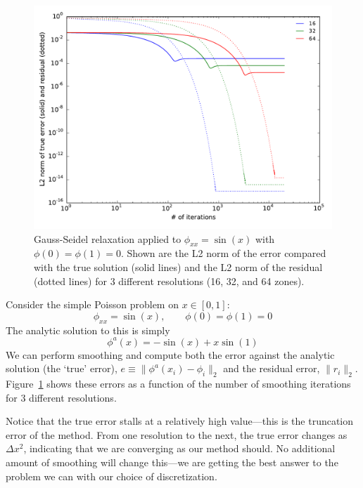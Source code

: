 \begin{figure}
\centering
\includegraphics[width=\linewidth]{smooth-error}
\caption[Convergence as a function of number of iterations using Gauss-Seidel relaxation]{\label{fig:smootherror} Gauss-Seidel relaxation applied to
  $\phi_{xx} = \sin(x)$ with $\phi(0) = \phi(1) = 0$.  Shown are the
  L2 norm of the error compared with the true solution (solid lines)
  and the L2 norm of the residual (dotted lines) for 3 different
  resolutions (16, 32, and 64 zones). \\
  }
\end{figure}

Consider the simple Poisson problem on $x \in [0,1]$:
\begin{equation}
\phi_{xx} = \sin(x), \qquad \phi(0) = \phi(1) = 0
\end{equation}
The analytic solution to this is simply 
\begin{equation}
\phi^a(x) = -\sin(x) + x \sin(1)
\end{equation}
We can perform smoothing and compute both the error against the
analytic solution (the `true' error), $e \equiv \| \phi^a(x_i) - \phi_i \|_2$ and the
residual error, $\| r_i \|_2$.  Figure~\ref{fig:smootherror} shows these
errors as a function of the number of smoothing iterations for 3
different resolutions.

Notice that the true error stalls at a relatively high value---this is
the truncation error of the method.  From one resolution to the next,
the true error changes as $\Delta x^2$, indicating that we are
converging as our method should.  No additional amount of smoothing
will change this---we are getting the best answer to the problem we
can with our choice of discretization.

